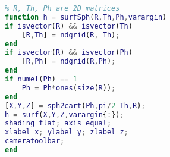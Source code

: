 
\begin{lstlisting}[language=matlab]
% surf() in spherical coordinate
% R, Th, Ph are 2D matrices
function h = surfSph(R,Th,Ph,varargin)
if isvector(R) && isvector(Th)
    [R,Th] = ndgrid(R, Th);
end
if isvector(R) && isvector(Ph)
    [R,Ph] = ndgrid(R,Ph);
end
if numel(Ph) == 1
    Ph = Ph*ones(size(R));
end
[X,Y,Z] = sph2cart(Ph,pi/2-Th,R);
h = surf(X,Y,Z,varargin{:});
shading flat; axis equal;
xlabel x; ylabel y; zlabel z;
cameratoolbar;
end
\end{lstlisting}

